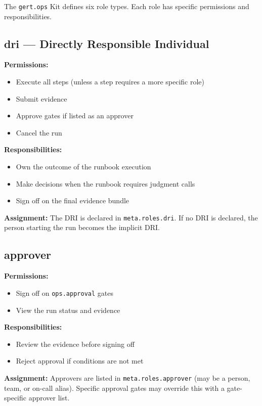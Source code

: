 The \texttt{gert.ops} Kit defines six role types. Each role has specific permissions and responsibilities.

\subsection{dri — Directly Responsible Individual}

\textbf{Permissions:}
\begin{itemize}
  \item Execute all steps (unless a step requires a more specific role)
  \item Submit evidence
  \item Approve gates if listed as an approver
  \item Cancel the run
\end{itemize}

\textbf{Responsibilities:}
\begin{itemize}
  \item Own the outcome of the runbook execution
  \item Make decisions when the runbook requires judgment calls
  \item Sign off on the final evidence bundle
\end{itemize}

\textbf{Assignment:} The DRI is declared in \texttt{meta.roles.dri}. If no DRI is declared, the person starting the run becomes the implicit DRI.

\subsection{approver}

\textbf{Permissions:}
\begin{itemize}
  \item Sign off on \texttt{ops.approval} gates
  \item View the run status and evidence
\end{itemize}

\textbf{Responsibilities:}
\begin{itemize}
  \item Review the evidence before signing off
  \item Reject approval if conditions are not met
\end{itemize}

\textbf{Assignment:} Approvers are listed in \texttt{meta.roles.approver} (may be a person, team, or on-call alias). Specific approval gates may override this with a gate-specific approver list.

